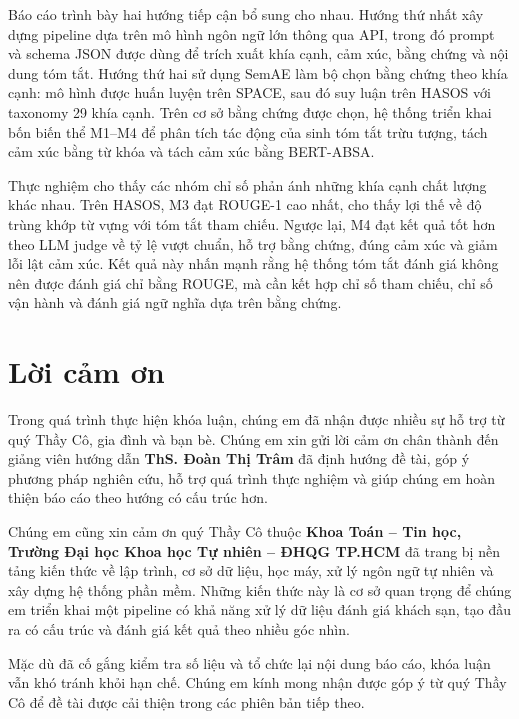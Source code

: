 \documentclass[12pt,a4paper]{report}
\newcommand{\universityname}{Trường Đại học Khoa học Tự nhiên -- ĐHQG TP.HCM}
\newcommand{\facultyname}{Khoa Toán -- Tin học}
\newcommand{\advisorname}{ThS. Đoàn Thị Trâm}
\begin{document}
Báo cáo trình bày hai hướng tiếp cận bổ sung cho nhau. Hướng thứ nhất xây dựng pipeline dựa trên mô hình ngôn ngữ lớn thông qua API, trong đó prompt và schema JSON được dùng để trích xuất khía cạnh, cảm xúc, bằng chứng và nội dung tóm tắt. Hướng thứ hai sử dụng SemAE làm bộ chọn bằng chứng theo khía cạnh: mô hình được huấn luyện trên SPACE, sau đó suy luận trên HASOS với taxonomy 29 khía cạnh. Trên cơ sở bằng chứng được chọn, hệ thống triển khai bốn biến thể M1--M4 để phân tích tác động của sinh tóm tắt trừu tượng, tách cảm xúc bằng từ khóa và tách cảm xúc bằng BERT-ABSA.

Thực nghiệm cho thấy các nhóm chỉ số phản ánh những khía cạnh chất lượng khác nhau. Trên HASOS, M3 đạt ROUGE-1 cao nhất, cho thấy lợi thế về độ trùng khớp từ vựng với tóm tắt tham chiếu. Ngược lại, M4 đạt kết quả tốt hơn theo LLM judge về tỷ lệ vượt chuẩn, hỗ trợ bằng chứng, đúng cảm xúc và giảm lỗi lật cảm xúc. Kết quả này nhấn mạnh rằng hệ thống tóm tắt đánh giá không nên được đánh giá chỉ bằng ROUGE, mà cần kết hợp chỉ số tham chiếu, chỉ số vận hành và đánh giá ngữ nghĩa dựa trên bằng chứng.

\clearpage

\tableofcontents
\clearpage
\listoffigures
\clearpage
\listoftables
\clearpage

\chapter*{Lời cảm ơn}

Trong quá trình thực hiện khóa luận, chúng em đã nhận được nhiều sự hỗ trợ từ quý Thầy Cô, gia đình và bạn bè. Chúng em xin gửi lời cảm ơn chân thành đến giảng viên hướng dẫn \textbf{\advisorname} đã định hướng đề tài, góp ý phương pháp nghiên cứu, hỗ trợ quá trình thực nghiệm và giúp chúng em hoàn thiện báo cáo theo hướng có cấu trúc hơn.

Chúng em cũng xin cảm ơn quý Thầy Cô thuộc \textbf{\facultyname, \universityname} đã trang bị nền tảng kiến thức về lập trình, cơ sở dữ liệu, học máy, xử lý ngôn ngữ tự nhiên và xây dựng hệ thống phần mềm. Những kiến thức này là cơ sở quan trọng để chúng em triển khai một pipeline có khả năng xử lý dữ liệu đánh giá khách sạn, tạo đầu ra có cấu trúc và đánh giá kết quả theo nhiều góc nhìn.

Mặc dù đã cố gắng kiểm tra số liệu và tổ chức lại nội dung báo cáo, khóa luận vẫn khó tránh khỏi hạn chế. Chúng em kính mong nhận được góp ý từ quý Thầy Cô để đề tài được cải thiện trong các phiên bản tiếp theo.
\end{document}
